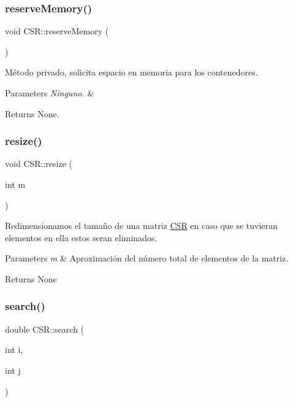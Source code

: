 \subsubsection{\texorpdfstring{reserve\+Memory()}{reserveMemory()}}
{\footnotesize\ttfamily void C\+S\+R\+::reserve\+Memory (\begin{DoxyParamCaption}{ }\end{DoxyParamCaption})}



Método privado, solicita espacio en memoria para los contenedores. 


\begin{DoxyParams}{Parameters}
{\em Ninguno.} & \\
\hline
\end{DoxyParams}
\begin{DoxyReturn}{Returns}
None. 
\end{DoxyReturn}
\hypertarget{class_c_s_r_ad89020cc1d7d9fcda50e2b241e928c5b}{}\label{class_c_s_r_ad89020cc1d7d9fcda50e2b241e928c5b} 
\subsubsection{\texorpdfstring{resize()}{resize()}}
{\footnotesize\ttfamily void C\+S\+R\+::resize (\begin{DoxyParamCaption}\item[{int}]{m }\end{DoxyParamCaption})}



Redimensionamos el tamaño de una matriz \hyperlink{class_c_s_r}{C\+SR} en caso que se tuvieran elementos en ella estos seran eliminados. 


\begin{DoxyParams}{Parameters}
{\em m} & Aproximación del número total de elementos de la matriz. \\
\hline
\end{DoxyParams}
\begin{DoxyReturn}{Returns}
None 
\end{DoxyReturn}
\hypertarget{class_c_s_r_afd302aaea45e8bb0acbd4fea15aa39be}{}\label{class_c_s_r_afd302aaea45e8bb0acbd4fea15aa39be} 
\subsubsection{\texorpdfstring{search()}{search()}}
{\footnotesize\ttfamily double C\+S\+R\+::search (\begin{DoxyParamCaption}\item[{int}]{i,  }\item[{int}]{j }\end{DoxyParamCaption})}



